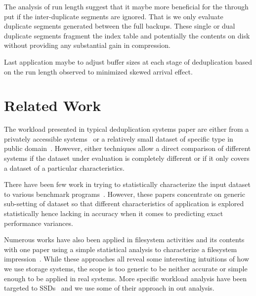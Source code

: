 The analysis of run length suggest that it maybe more beneficial for the through put if the inter-duplicate segments are ignored. That is we only evaluate duplicate segments generated between the full backups. These single or dual duplicate segments fragment the index table and potentially the contents on disk without providing any substantial gain in compression. 

Last application maybe to adjust buffer sizes at each stage of deduplication based on the run length observed to minimized skewed arrival effect. 

\section{Related Work}\label{rel}
The workload presented in typical deduplication systems paper are either from a privately accessible systems~\cite{clements:2009, rhea:2008, manber:1994,koller:2010, aronovich:2009, lillibridge:2009, zhu:2008} or a relatively small dataset of specific type in public domain~\cite{storer:2008,kruus:2010,eshghi:2005}. However, either techniques allow a direct comparison of different systems if the dataset under evaluation is completely different or if it only covers a dataset of a particular characteristics. 

There have been few work in trying to statistically characterize the input dataset to various benchmark programs~\cite{eeckhout:2003, yi:2002, hsu:2002}. However, these papers concentrate on generic sub-setting of dataset so that different characteristics of application is explored statistically hence lacking in accuracy when it comes to predicting exact performance variances. 

Numerous works have also been applied in filesystem activities and its contents~\cite{douceur:1999, leung:2008, douceur:1999} with one paper using a simple statistical analysis to characterize a filesystem impression~\cite{agrawal:2009}. While these approaches all reveal some interesting intuitions of how we use storage systems, the scope is too generic to be neither accurate or simple enough to be applied in real systems. More specific workload analysis have been targeted to SSDs~\cite{soundararajan:2010} and we use some of their approach in out analysis. 



